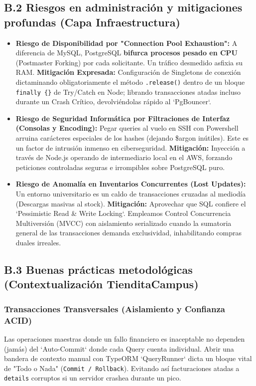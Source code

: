 \documentclass[12pt,a4paper]{article}
\begin{document}
\subsection{B.2 Riesgos en administración y mitigaciones profundas (Capa Infraestructura)}
\begin{itemize}
    \item \textbf{Riesgo de Disponibilidad por "Connection Pool Exhaustion":} A diferencia de MySQL, PostgreSQL \textbf{bifurca procesos pesado en CPU} (Postmaster Forking) por cada solicitante. Un tráfico desmedido asfixia su RAM. \textbf{Mitigación Expresada:} Configuración de Singletons de conexión dictaminando obligatoriamente el método \texttt{.release()} dentro de un bloque \texttt{finally \{\}} de Try/Catch en Node; librando transacciones atadas incluso durante un Crash Crítico, devolviéndolas rápido al `PgBouncer`.
    \item \textbf{Riesgo de Seguridad Informática por Filtraciones de Interfaz (Consolas y Encoding):} Pegar queries al vuelo en SSH con Powershell arruina carácteres especiales de los hashes (dejando \$argon inútiles). Este es un factor de intrusión inmenso en ciberseguridad. \textbf{Mitigación:} Inyección a través de Node.js operando de intermediario local en el AWS, forzando peticiones controladas seguras e irrompibles sobre PostgreSQL puro.
    \item \textbf{Riesgo de Anomalía en Inventarios Concurrentes (Lost Updates):} Un entorno universitario es un caldo de transacciones cruzadas al mediodía (Descargas masivas al stock). \textbf{Mitigación:} Aprovechar que SQL confiere el `Pessimistic Read \& Write Locking`. Empleamos Control Concurrencia Multiversión (MVCC) con aislamiento serializado cuando la sumatoria general de las transacciones demanda exclusividad, inhabilitando compras duales irreales.
\end{itemize}

\subsection{B.3 Buenas prácticas metodológicas (Contextualización TienditaCampus)}

\subsubsection{Transacciones Transversales (Aislamiento y Confianza ACID)}
Las operaciones maestras donde un fallo financiero es inaceptable no dependen (jamás) del `Auto-Commit` donde cada Query cuenta individual. Abrir una bandera de contexto manual con TypeORM `QueryRunner` dicta un bloque vital de "Todo o Nada" (\texttt{Commit / Rollback}). Evitando así facturaciones atadas a \texttt{details} corruptos si un servidor crashea durante un pico.
\end{document}
